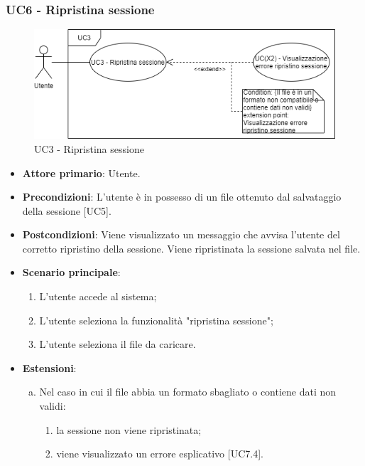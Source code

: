\subsubsection{UC6 - Ripristina sessione}
\begin{figure}[h]
\includegraphics[width=\linewidth]{section/Images/UC3RipristinaSessione.png}
\centering
\caption{UC3 - Ripristina sessione}
\end{figure}
\begin{itemize}
	\item \textbf{Attore primario}: Utente.
	\item \textbf{Precondizioni}: L'utente è in possesso di un file ottenuto dal salvataggio della sessione [UC5].
	\item \textbf{Postcondizioni}: Viene visualizzato un messaggio che avvisa l'utente del corretto ripristino della sessione. Viene ripristinata la sessione salvata nel file.
	\item \textbf{Scenario principale}:
		\begin{enumerate}
			\item L'utente accede al sistema;
			\item L'utente seleziona la funzionalità "ripristina sessione";
			\item L'utente seleziona il file da caricare.
		\end{enumerate}
	\item \textbf{Estensioni}:
	\begin{enumerate}[(a)]
		\item Nel caso in cui il file abbia un formato sbagliato o contiene dati non validi:
		\begin{enumerate}[1.]
			\item la sessione non viene ripristinata;
			\item viene visualizzato un errore esplicativo [UC7.4].
		\end{enumerate}
	\end{enumerate}
\end{itemize}